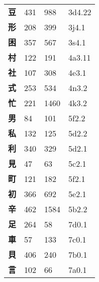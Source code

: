 \begin{longtable}[c]{llll}
    \bfseries 豆 & 431 & 988 & 3d4.22\\
    \bfseries 形 & 208 & 399 & 3j4.1\\
    \bfseries 困 & 357 & 567 & 3s4.1\\
    \bfseries 村 & 122 & 191 & 4a3.11\\
    \bfseries 社 & 107 & 308 & 4e3.1\\
    \bfseries 式 & 253 & 534 & 4n3.2\\
    \bfseries 忙 & 221 & 1460 & 4k3.2\\
    \bfseries 男 & 84 & 101 & 5f2.2\\
    \bfseries 私 & 132 & 125 & 5d2.2\\
    \bfseries 利 & 340 & 329 & 5d2.1\\
    \bfseries 見 & 47 & 63 & 5c2.1\\
    \bfseries 町 & 121 & 182 & 5f2.1\\
    \bfseries 初 & 366 & 692 & 5e2.1\\
    \bfseries 辛 & 462 & 1584 & 5b2.2\\
    \bfseries 足 & 264 & 58 & 7d0.1\\
    \bfseries 車 & 57 & 133 & 7c0.1\\
    \bfseries 貝 & 406 & 240 & 7b0.1\\
    \bfseries 言 & 102 & 66 & 7a0.1\\
  \end{longtable}

